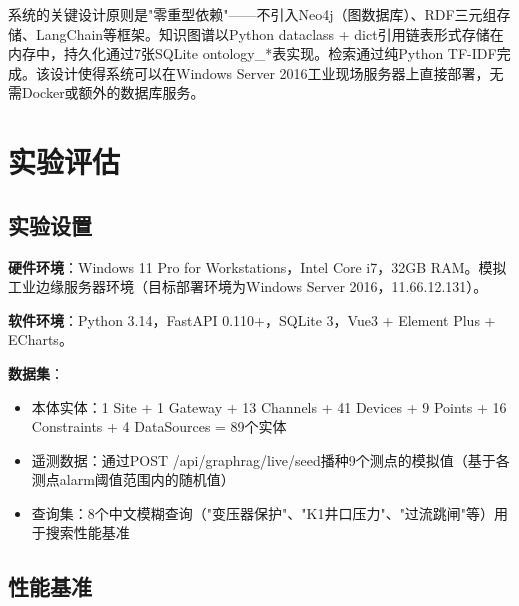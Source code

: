 \documentclass[12pt,a4paper]{article}
\begin{document}
系统的关键设计原则是"零重型依赖"——不引入Neo4j（图数据库）、RDF三元组存储、LangChain等框架。知识图谱以Python dataclass + dict引用链表形式存储在内存中，持久化通过7张SQLite ontology\_*表实现。检索通过纯Python TF-IDF完成。该设计使得系统可以在Windows Server 2016工业现场服务器上直接部署，无需Docker或额外的数据库服务。

\section{实验评估}

\subsection{实验设置}

\textbf{硬件环境}：Windows 11 Pro for Workstations，Intel Core i7，32GB RAM。模拟工业边缘服务器环境（目标部署环境为Windows Server 2016，11.66.12.131）。

\textbf{软件环境}：Python 3.14，FastAPI 0.110+，SQLite 3，Vue3 + Element Plus + ECharts。

\textbf{数据集}：
\begin{itemize}
  \item 本体实体：1 Site + 1 Gateway + 13 Channels + 41 Devices + 9 Points + 16 Constraints + 4 DataSources = 89个实体
  \item 遥测数据：通过POST /api/graphrag/live/seed播种9个测点的模拟值（基于各测点alarm阈值范围内的随机值）
  \item 查询集：8个中文模糊查询（"变压器保护"、"K1井口压力"、"过流跳闸"等）用于搜索性能基准
\end{itemize}

\subsection{性能基准}
\end{document}

